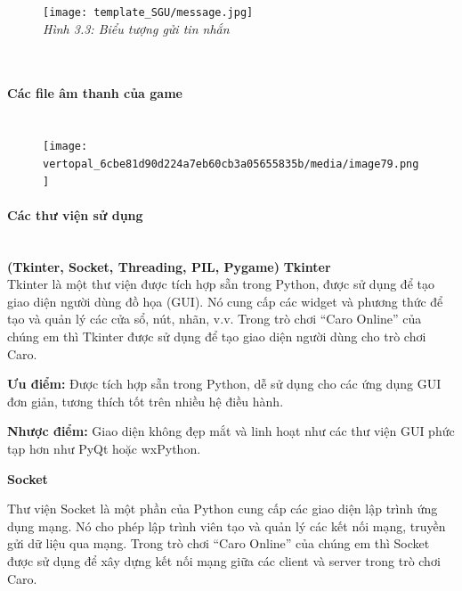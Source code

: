 \documentclass[a4paper]{article}
\begin{document}
\begin{figure}
    \centering

\texttt{[image: template\_SGU/message.jpg]}
\\
    \centering \emph{Hình 3.3: Biểu tượng gửi tin nhắn}
\end{figure}
\\
\paragraph{Các file âm thanh của game}\label{cuxe1c-file-uxe2m-thanh-cux1ee7a-game}
\vspace{0.5cm}
\begin{figure}
\\
    \centering
\texttt{[image: vertopal\_6cbe81d90d224a7eb60cb3a05655835b/media/image79.png]}

\end{figure}


\hypertarget{cuxe1c-thux1b0-viux1ec7n-sux1eed-dux1ee5ng}{%
\paragraph{Các thư viện sử
dụng}\label{cuxe1c-thux1b0-viux1ec7n-sux1eed-dux1ee5ng}}
\\
\textbf{(Tkinter, Socket, Threading, PIL, Pygame)}
\newline
\textbf{Tkinter}
\\
Tkinter là một thư viện được tích hợp sẵn trong Python, được sử dụng để
tạo giao diện người dùng đồ họa (GUI). Nó cung cấp các widget và phương
thức để tạo và quản lý các cửa sổ, nút, nhãn, v.v. Trong trò chơi ``Caro
Online'' của chúng em thì Tkinter được sử dụng để tạo giao diện người
dùng cho trò chơi Caro.

\textbf{Ưu điểm:} Được tích hợp sẵn trong Python, dễ sử dụng cho các ứng
dụng GUI đơn giản, tương thích tốt trên nhiều hệ điều hành.

\textbf{Nhược điểm:} Giao diện không đẹp mắt và linh hoạt như các thư
viện GUI phức tạp hơn như PyQt hoặc wxPython.

\textbf{Socket}

Thư viện Socket là một phần của Python cung cấp các giao diện lập trình
ứng dụng mạng. Nó cho phép lập trình viên tạo và quản lý các kết nối
mạng, truyền gửi dữ liệu qua mạng. Trong trò chơi ``Caro Online'' của
chúng em thì Socket được sử dụng để xây dựng kết nối mạng giữa các
client và server trong trò chơi Caro.
\end{document}
